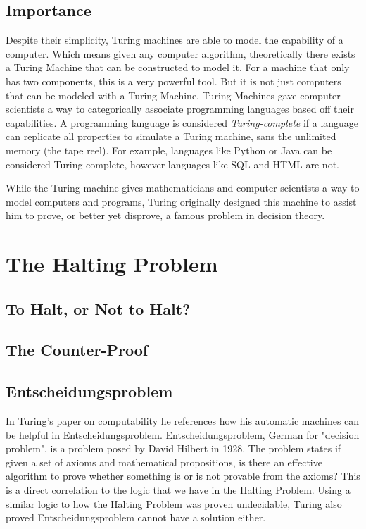\documentclass[12pt]{article}
\begin{document}
\subsection{Importance}

Despite their simplicity, Turing machines are able to model the capability of a computer. Which means given any computer algorithm, theoretically there exists a Turing Machine that can be constructed to model it. For a machine that only has two components, this is a very powerful tool. But it is not just computers that can be modeled with a Turing Machine. Turing Machines gave computer scientists a way to categorically associate programming languages based off their capabilities. A programming language is considered \textit{Turing-complete} if a language can replicate all properties to simulate a Turing machine, sans the unlimited memory (the tape reel). For example, languages like Python or Java can be considered Turing-complete, however languages like SQL and HTML are not.

While the Turing machine gives mathematicians and computer scientists a way to model computers and programs, Turing originally designed this machine to assist him to prove, or better yet disprove, a famous problem in decision theory.


\section{The Halting Problem}

\subsection{To Halt, or Not to Halt?}

\subsection{The Counter-Proof}

\subsection{Entscheidungsproblem}

In Turing's paper on computability he references how his automatic machines can be helpful in Entscheidungsproblem. Entscheidungsproblem, German for "decision problem", is a problem posed by David Hilbert in 1928. The problem states if given a set of  axioms and mathematical propositions, is there an effective algorithm to prove whether something is or is not provable from the axioms? This is a direct correlation to the logic that we have in the Halting Problem. Using a similar logic to how the Halting Problem was proven undecidable, Turing also proved Entscheidungsproblem cannot have a solution either.
\end{document}

